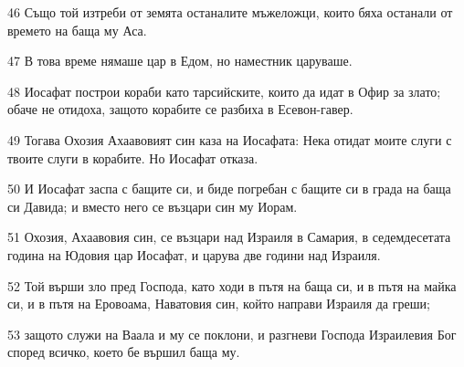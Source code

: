 \par 46 Също той изтреби от земята останалите мъжеложци, които бяха останали от времето на баща му Аса.
\par 47 В това време нямаше цар в Едом, но наместник царуваше.
\par 48 Иосафат построи кораби като тарсийските, които да идат в Офир за злато; обаче не отидоха, защото корабите се разбиха в Есевон-гавер.
\par 49 Тогава Охозия Ахаавовият син каза на Иосафата: Нека отидат моите слуги с твоите слуги в корабите. Но Иосафат отказа.
\par 50 И Иосафат заспа с бащите си, и биде погребан с бащите си в града на баща си Давида; и вместо него се възцари син му Иорам.
\par 51 Охозия, Ахаавовия син, се възцари над Израиля в Самария, в седемдесетата година на Юдовия цар Иосафат, и царува две години над Израиля.
\par 52 Той върши зло пред Господа, като ходи в пътя на баща си, и в пътя на майка си, и в пътя на Еровоама, Наватовия син, който направи Израиля да греши;
\par 53 защото служи на Ваала и му се поклони, и разгневи Господа Израилевия Бог според всичко, което бе вършил баща му.

